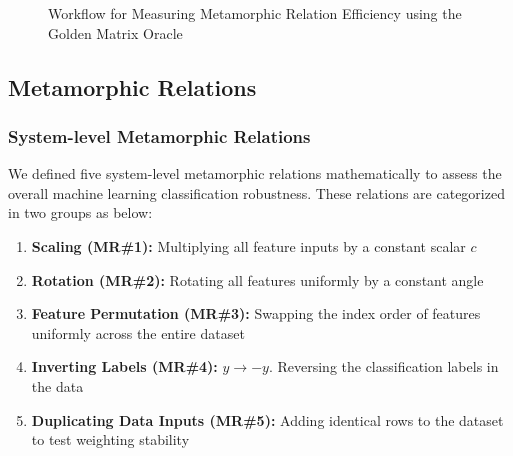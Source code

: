 \documentclass[12pt,a4paper]{article}
\begin{document}
\begin{figure}[ht!]
		\caption{Workflow for Measuring Metamorphic Relation Efficiency using the Golden Matrix Oracle}
		\label{fig:golden_matrix_flow}
	\end{figure}
	
	\subsection{Metamorphic Relations}
	
	\subsubsection{System-level Metamorphic Relations}
	\label{sec:sys_mrs}
	
	We defined five system-level metamorphic relations mathematically to assess the overall machine learning classification robustness. These relations are categorized in two groups as below:
	
	\begin{enumerate}
		\item \textbf{Scaling (MR\#1):} Multiplying all feature inputs by a constant scalar $c$
		\item \textbf{Rotation (MR\#2):} Rotating all features uniformly by a constant angle
		\item \textbf{Feature Permutation (MR\#3):} Swapping the index order of features uniformly across the entire dataset
		\item \textbf{Inverting Labels (MR\#4):} $y \to -y$. Reversing the classification labels in the data
		\item \textbf{Duplicating Data Inputs (MR\#5):} Adding identical rows to the dataset to test weighting stability
	\end{enumerate}
	
\end{document}
